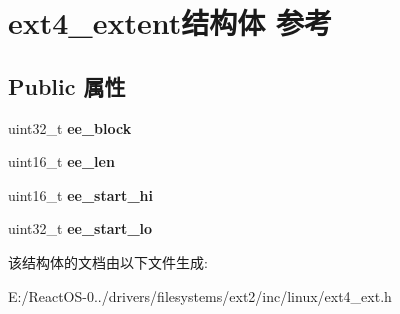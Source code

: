 \hypertarget{structext4__extent}{}\section{ext4\+\_\+extent结构体 参考}
\label{structext4__extent}
\subsection*{Public 属性}
\begin{DoxyCompactItemize}
\item 
\mbox{\label{structext4__extent_a6267de5e46f4b6a48c16621ccf9ee55b}} 
uint32\+\_\+t {\bfseries ee\+\_\+block}
\item 
\mbox{\label{structext4__extent_a4b6a945e3d9c05f7d8e24ba5d2a805c4}} 
uint16\+\_\+t {\bfseries ee\+\_\+len}
\item 
\mbox{\label{structext4__extent_a87acb2e6353c56c5a65c0f89071ba2b5}} 
uint16\+\_\+t {\bfseries ee\+\_\+start\+\_\+hi}
\item 
\mbox{\label{structext4__extent_ad26ce1ff0c22eba2cbdf9899543da7bb}} 
uint32\+\_\+t {\bfseries ee\+\_\+start\+\_\+lo}
\end{DoxyCompactItemize}


该结构体的文档由以下文件生成\+:\begin{DoxyCompactItemize}
\item 
E\+:/\+React\+O\+S-\/0../drivers/filesystems/ext2/inc/linux/ext4\+\_\+ext.\+h\end{DoxyCompactItemize}
